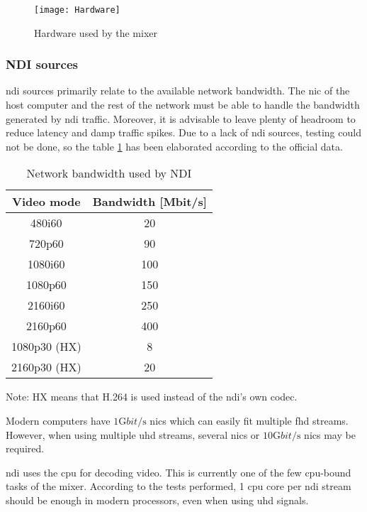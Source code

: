 \documentclass[../main.tex]{subfiles}
\begin{document}
\begin{figure}[htbp]
    \centering
    \texttt{[image: Hardware]}
    \caption{Hardware used by the mixer}
    \label{fig:05:used_hardware}
\end{figure}

\subsubsection{NDI sources}
\Gls{ndi} sources primarily relate to the available network bandwidth. The \gls{nic} of the host computer and the rest of the network must be able to handle the bandwidth generated by \gls{ndi} traffic. Moreover, it is advisable to leave plenty of headroom to reduce latency and damp traffic spikes. Due to a lack of \gls{ndi} sources, testing could not be done, so the table \ref{tab:05:ndi_bandwidth} has been elaborated according to the official data\cite{ndiBandwidth}.\newline

\begin{table}[htbp]
    \centering
    \begin{tabular}{|c|c|}
        \hline
        Video mode  & Bandwidth [Mbit/s]    \\\hline
        480i60      & 20    \\\hline
        720p60 	    & 90    \\\hline
        1080i60 	& 100   \\\hline
        1080p60 	& 150   \\\hline
        2160i60 	& 250   \\\hline
        2160p60	    & 400   \\\hline
        1080p30 (HX)& 8     \\\hline
        2160p30 (HX)& 20    \\\hline
    \end{tabular}
    
    Note: HX means that H.264 is used instead of the \gls{ndi}'s own codec.
    \caption{Network bandwidth used by NDI}
    \label{tab:05:ndi_bandwidth}
\end{table}

Modern computers have $1 \si{\giga bit\per\second}$ \glspl{nic} which can easily fit multiple \gls{fhd} streams. However, when using multiple \gls{uhd} streams, several \glspl{nic} or $10 \si{\giga bit\per\second}$ \glspl{nic} may be required.\newline

\Gls{ndi} uses the \gls{cpu} for decoding video. This is currently one of the few \gls{cpu}-bound tasks of the mixer. According to the tests performed, 1 \gls{cpu} core per \gls{ndi} stream should be enough in modern processors, even when using \gls{uhd} signals.\newline
\end{document}
